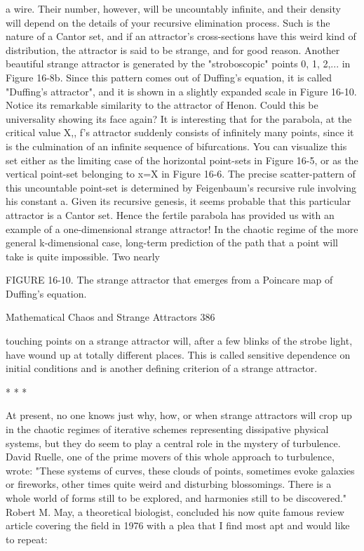 a wire. Their number, however, will be uncountably infinite, and their density will
depend on the details of your recursive elimination process. Such is the nature of a
Cantor set, and if an attractor's cross-sections have this weird kind of distribution, the
attractor is said to be strange, and for good reason.
          Another beautiful strange attractor is generated by the "stroboscopic" points 0,
1, 2,... in Figure 16-8b. Since this pattern comes out of Duffing's equation, it is called
"Duffing's attractor", and it is shown in a slightly expanded scale in Figure 16-10.
Notice its remarkable similarity to the attractor of Henon. Could this be universality
showing its face again?
          It is interesting that for the parabola, at the critical value X,, f's attractor
suddenly consists of infinitely many points, since it is the culmination of an infinite
sequence of bifurcations. You can visualize this set either as the limiting case of the
horizontal point-sets in Figure 16-5, or as the vertical point-set belonging to x=X in
Figure 16-6. The precise scatter-pattern of this uncountable point-set is determined by
Feigenbaum's recursive rule involving his constant a. Given its recursive genesis, it
seems probable that this particular attractor is a Cantor set. Hence the fertile parabola
has provided us with an example of a one-dimensional strange attractor!
In the chaotic regime of the more general k-dimensional case, long-term prediction of
the path that a point will take is quite impossible. Two nearly

FIGURE 16-10. The strange attractor that emerges from a Poincare map of Duffing's
equation.




Mathematical Chaos and Strange Attractors                                             386

touching points on a strange attractor will, after a few blinks of the strobe light, have
wound up at totally different places. This is called sensitive dependence on initial
conditions and is another defining criterion of a strange attractor.

                                       *   *   *

         At present, no one knows just why, how, or when strange attractors will crop
up in the chaotic regimes of iterative schemes representing dissipative physical
systems, but they do seem to play a central role in the mystery of turbulence. David
Ruelle, one of the prime movers of this whole approach to turbulence, wrote: "These
systems of curves, these clouds of points, sometimes evoke galaxies or fireworks,
other times quite weird and disturbing blossomings. There is a whole world of forms
still to be explored, and harmonies still to be discovered."
         Robert M. May, a theoretical biologist, concluded his now quite famous
review article covering the field in 1976 with a plea that I find most apt and would
like to repeat:

